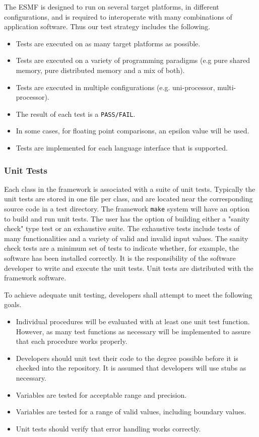 The ESMF is designed to run on several target platforms, in different 
configurations, and is required to interoperate with many combinations 
of application software. Thus our test strategy includes the following.

\begin{itemize}
\item Tests are executed on as many target platforms as possible. 
\item Tests are executed on a variety of programming paradigms
(e.g pure shared memory, pure distributed memory and a mix of both).
\item Tests are executed in multiple configurations (e.g. uni-processor,
multi-processor).
\item The result of each test is a {\tt PASS/FAIL}.  
\item In some cases, for floating point comparisons, an epsilon value
will be used.
\item Tests are implemented for each language interface that is 
supported.
\end{itemize}

\subsubsection{Unit Tests}

Each class in the framework is associated with a suite of unit tests.
Typically the unit tests are stored in one file per class, and are
located near the corresponding source code in a test directory.  The 
framework {\tt make} system will have an option to build and run unit tests.
The user has the option of building either a "sanity check" type test
or an exhaustive suite. The exhaustive tests include tests of many 
functionalities and a variety of valid and invalid input values. The sanity 
check tests are a minimum set of tests to indicate whether, for example, the 
software has been installed correctly. It is the responsibility of the 
software developer to write and execute the unit tests. Unit tests 
are distributed with the framework software.

To achieve adequate unit testing, developers shall attempt to meet the following goals. 

\begin{itemize}
\item Individual procedures will be evaluated with at least one unit
test function.  However, as many test functions as necessary will be
implemented to assure that each procedure works properly.  
\item Developers should unit test their code to the degree possible  
before it is checked into the repository.  It is assumed that 
developers will use stubs as necessary.
\item Variables are tested for acceptable range and precision.
\item Variables are tested for a range of valid values, including boundary
values.
\item Unit tests should verify that error handling works correctly.
\end{itemize}


